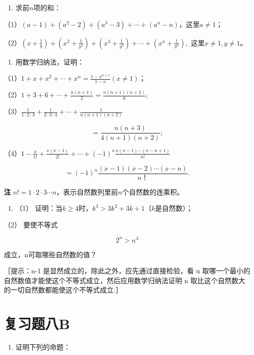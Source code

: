 \begin{enumerate}[start=9]
\item
  求前\(n\)项的和：
\end{enumerate}

（1）\((a - 1) + (a^2 - 2) + (a^3 - 3) + \cdots + (a^n - n)\)，这里\(a \neq 1\)；

（2）\(\left(x + \frac{1}{y}\right) + \left(x^2 + \frac{1}{y^2}\right) + \left(x^3 + \frac{1}{y^3}\right) + \cdots + \left(x^n + \frac{1}{y^n}\right),\)
这里\(x \neq 1, y \neq 1\)。

\begin{enumerate}[start=10]
\item
  用数学归纳法，证明：
\end{enumerate}

（1）\(1 + x + x^2 + \cdots + x^n = \frac{1 - x^{n+1}}{1 - x} (x \neq 1)\)；

（2）\(1 + 3 + 6 + \cdots + \frac{n(n + 1)}{2} = \frac{n(n + 1)(n + 2)}{6};\)

（3）\(\frac{1}{1 \cdot 2 \cdot 3} + \frac{1}{2 \cdot 3 \cdot 4} + \cdots + \frac{1}{n(n + 1)(n + 2)}\)

\[
= \frac{n (n + 3)}{4 (n + 1) (n + 2)};
\]

（4）\(1 - \frac{x}{1!} + \frac{x(x - 1)}{2!} + \cdots + (-1)^{n} \frac{x(x - 1) \cdots (x - n + 1)}{n!}\)

\[
= (- 1)^{n} \frac{(x - 1) (x - 2) \cdots (x - n)}{n \text{！}}.
\]

\textbf{注}
\(n! = 1 \cdot 2 \cdot 3 \cdots n\)，表示自然数列里前\(n\)个自然数的连乘积。

\begin{enumerate}[start=11]
\item
  （1）
  证明：当\(k \geqslant 4\)时，\(k^3 > 3k^2 + 3k + 1\)（\(k\)是自然数）；
\end{enumerate}

（2） 要使不等式

\[
2^{n} > n^{3}
\]

成立，n可取哪些自然数的值？

［提示：n-1 是显然成立的，除此之外，应先通过直接检验，看 u
取哪一个最小的自然数值才能使这个不等式成立，然后应用数学归纳法证明 n
取比这个自然数大的一切自然数都能使这个不等式成立.］

\section{复习题八B}

\begin{enumerate}
\item
  证明下列的命题：
\end{enumerate}

